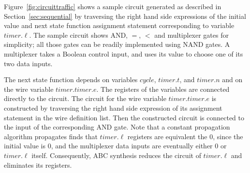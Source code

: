 \begin{example}
Figure~\ref{fig:circuittraffic} shows a sample circuit generated as described in 
Section~\ref{sec:sequential}
by traversing the right hand side expressions of the initial 
value and next state function assignment statement corresponding to variable
$timer.\ell$. 
The sample circuit shows AND, $=$, $<$ and multiplexer gates for simplicity; 
all those gates can be readily implemented using NAND gates. 
A multiplexer takes a Boolean control input, and uses its value to 
choose one of its two data inputs. 

The next state function depends on variables $cycle$, $timer.t$, and $timer.n$ and on 
the wire variable $timer.timer.e$. 
The registers of the variables are connected directly to the circuit. 
The circuit for the wire variable $timer.timer.e$ is constructed by traversing 
the right hand side expression of its 
assignment statement in the wire definition list. 
Then the constructed circuit is connected to the input of the corresponding AND gate. 
Note that a constant propagation algorithm propagates finds that 
$timer.\ell$ registers are equivalent the $0$, since the initial value is $0$, 
and the multiplexer data inputs are eventually either $0$ or $timer.\ell$ itself. 
Consequently, ABC synthesis reduces the circuit of $timer.\ell$ and eliminates its
registers. 

\end{example}